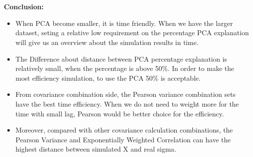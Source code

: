 \documentclass[a4paper,12pt]{article}
\begin{document}
\begin{figure}
    \\
    \\
\end{figure}
\newpage
\textbf{Conclusion:}
\begin{itemize}
    \item When PCA become smaller, it is time friendly. When we have the larger dataset, seting a relative low requirement on the percentage PCA explanation will give us an overview about the simulation results in time.
    \item The Difference about distance between PCA percentage explanation is relatively small, when the percentage is above 50$\%$. In order to make the most efficiency simulation, to use the PCA 50$\%$ is acceptable.
    \item From covariance combination side, the Pearson variance combination sets have the best time efficiency. When we do not need to weight more for the time with small lag, Pearson would be better choice for the efficiency.
    \item Moreover, compared with other covariance calculation combinations, the Pearson Variance and Exponentially Weighted Correlation can have the highest distance between simulated X and real sigma.
\end{itemize}
\end{document}
